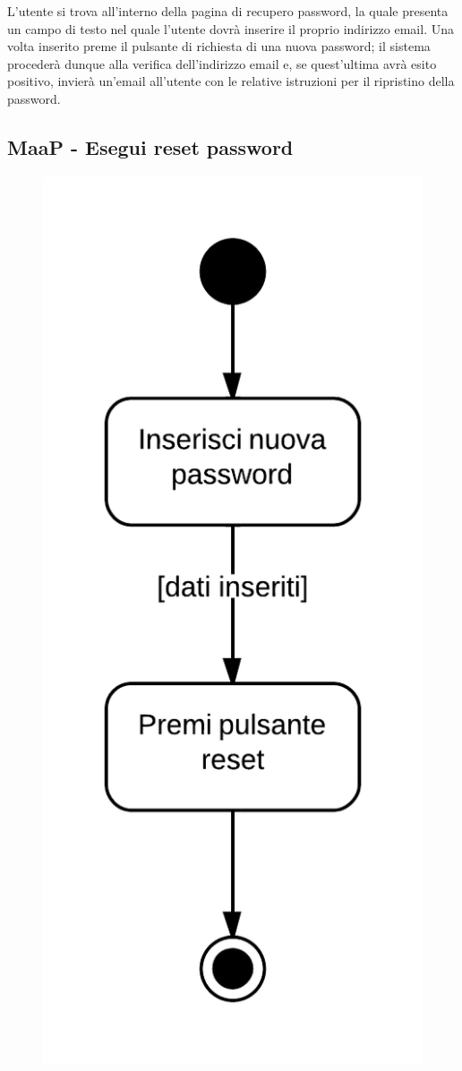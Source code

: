 L'utente si trova all'interno della pagina di recupero password, la quale presenta un campo di testo nel quale l'utente dovrà inserire il proprio indirizzo email. Una volta inserito preme il pulsante di richiesta di una nuova password; il sistema  procederà dunque alla verifica dell'indirizzo email e, se quest'ultima avrà esito positivo, invierà un'email all'utente con le relative istruzioni per il ripristino della password.

\subsection{MaaP - Esegui reset password}

\begin{figure}[H]
\centering
\includegraphics[scale=0.2]{uml/MaaP - Esegui reset password.png}

\end{figure}
